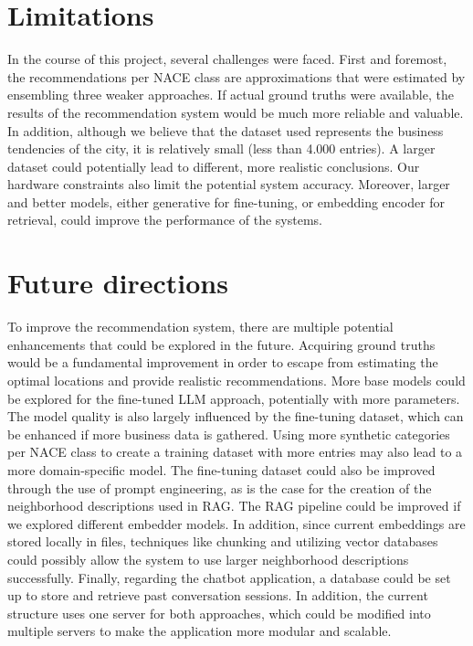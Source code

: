 \section{Limitations}

In the course of this project, several challenges were faced. First and foremost, the recommendations per NACE class are approximations that were estimated by ensembling three weaker approaches. If actual ground truths were available, the results of the recommendation system would be much more reliable and valuable. In addition, although we believe that the dataset used represents the business tendencies of the city, it is relatively small (less than 4.000 entries). A larger dataset could potentially lead to different, more realistic conclusions. Our hardware constraints also limit the potential system accuracy. Moreover, larger and better models, either generative for fine-tuning, or embedding encoder for retrieval, could improve the performance of the systems.


\section{Future directions}

To improve the recommendation system, there are multiple potential enhancements that could be explored in the future. Acquiring ground truths would be a fundamental improvement in order to escape from estimating the optimal locations and provide realistic recommendations. More base models could be explored for the fine-tuned LLM approach, potentially with more parameters. The model quality is also largely influenced by the fine-tuning dataset, which can be enhanced if more business data is gathered. Using more synthetic categories per NACE class to create a training dataset with more entries may also lead to a more domain-specific model. The fine-tuning dataset could also be improved through the use of prompt engineering, as is the case for the creation of the neighborhood descriptions used in RAG. The RAG pipeline could be improved if we explored different embedder models. In addition, since current embeddings are stored locally in files, techniques like chunking and utilizing vector databases could possibly allow the system to use larger neighborhood descriptions successfully. Finally, regarding the chatbot application, a database could be set up to store and retrieve past conversation sessions. In addition, the current structure uses one server for both approaches, which could be modified into multiple servers to make the application more modular and scalable.


